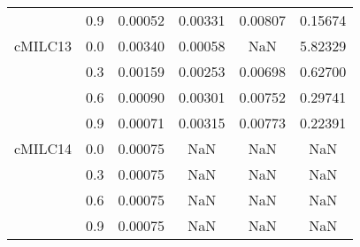 \begin{longtable}{cccccc}
        & 0.9 & 0.00052 & 0.00331 & 0.00807 & 0.15674 \\
cMILC13 & 0.0 & 0.00340 & 0.00058 & NaN & 5.82329 \\
        & 0.3 & 0.00159 & 0.00253 & 0.00698 & 0.62700 \\
        & 0.6 & 0.00090 & 0.00301 & 0.00752 & 0.29741 \\
        & 0.9 & 0.00071 & 0.00315 & 0.00773 & 0.22391 \\
cMILC14 & 0.0 & 0.00075 & NaN & NaN & NaN \\
        & 0.3 & 0.00075 & NaN & NaN & NaN \\
        & 0.6 & 0.00075 & NaN & NaN & NaN \\
        & 0.9 & 0.00075 & NaN & NaN & NaN \\
\end{longtable}
